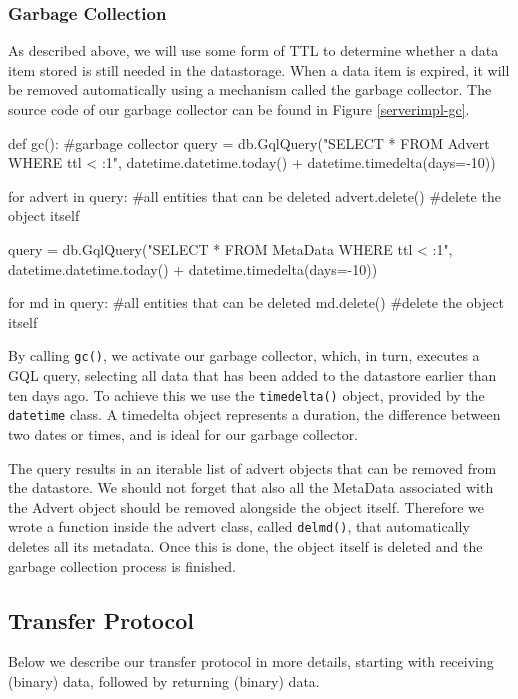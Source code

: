 \subsubsection{Garbage Collection}
As described above, we will use some form of TTL to determine whether a data item
stored is still needed in the datastorage. When a data item is expired, it will
be removed automatically using a mechanism called the garbage collector.
The source code of our garbage collector can be found in Figure
\ref{serverimpl-gc}.

\begin{figure*}[ht] %
\begin{center}
\begin{code}
def gc(): #garbage collector
  query = db.GqlQuery("SELECT * FROM Advert WHERE ttl < :1", 
                      datetime.datetime.today() + datetime.timedelta(days=-10))
  
  for advert in query: #all entities that can be deleted
    advert.delete()    #delete the object itself
    
  query = db.GqlQuery("SELECT * FROM MetaData WHERE ttl < :1", 
                      datetime.datetime.today() + datetime.timedelta(days=-10))
  
  for md in query: #all entities that can be deleted
    md.delete()    #delete the object itself
\end{code}
\caption{The Garbage Collector.\label{serverimpl-gc}}
\end{center}
\end{figure*}

By calling \texttt{gc()}, we activate our garbage collector, which, in turn,
executes a GQL query, selecting all data that has been added to the datastore
earlier than ten days ago. To achieve this we use the \texttt{timedelta()}
object, provided by the \texttt{datetime} class. A timedelta object
represents a duration, the difference between two dates or times, and is ideal
for our garbage collector.

The query results in an iterable list of advert objects that can be removed
from the datastore. We should not forget that also all the MetaData
associated with the Advert object should be removed alongside the object itself.
Therefore we wrote a function inside the advert class, called \texttt{delmd()},
that automatically deletes all its metadata. Once this is done, the object
itself is deleted and the garbage collection process is finished.

\subsection{Transfer Protocol}
Below we describe our transfer protocol in more details, starting with
receiving (binary) data, followed by returning (binary) data.
      
